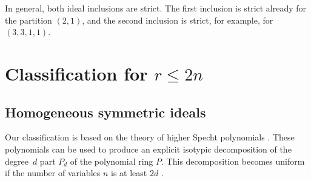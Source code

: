 \documentclass[11pt]{amsart}
\theoremstyle{definition}
\begin{document}
In general, both ideal inclusions are strict. The first inclusion is strict already for the partition $(2,1)$, and the second inclusion is strict, for example, for $(3,3,1,1)$.


\section{Classification for $r \leq 2n$}\label{section:classification}

\subsection{Homogeneous symmetric ideals}
Our classification is based on the theory of higher Specht polynomials \cite{Terasoma1993Higher}. These polynomials can be used to produce an explicit isotypic decomposition of the degree~$d$ part $P_d$ of the polynomial ring $P$. This decomposition becomes uniform if the number of variables $n$ is at least $2d$ \cite{Riener2013Symmetries}.
\end{document}
